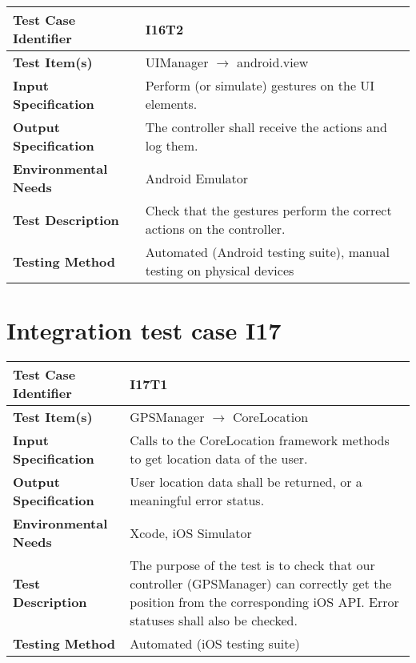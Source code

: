 \vspace{2em}

\noindent\begin{tabular}{l p{}}
    \hline
    \textbf{Test Case Identifier} & I16T2\\
    \hline
    \textbf{Test Item(s)} & UIManager $\rightarrow$ android.view \\
    \hline
    \textbf{Input Specification} & Perform (or simulate) gestures on the UI elements.\\
    \hline
    \textbf{Output Specification} & The controller shall receive the actions and log them. \\
    \hline
    \textbf{Environmental Needs} & Android Emulator \\
    \hline
    \textbf{Test Description} & Check that the gestures perform the correct actions on the controller.\\
    \hline
    \textbf{Testing Method} & Automated (Android testing suite), manual testing on physical devices \\
    \hline
\end{tabular}

\vspace{2em}

\section{Integration test case I17}

\begin{tabular}{l p{}}
    \hline
    \textbf{Test Case Identifier} & I17T1\\
    \hline
    \textbf{Test Item(s)} & GPSManager $\rightarrow$ CoreLocation \\
    \hline
    \textbf{Input Specification} & Calls to the CoreLocation framework methods to get location data of the user. \\
    \hline
    \textbf{Output Specification} & User location data shall be returned, or a meaningful error status. \\
    \hline
    \textbf{Environmental Needs} & Xcode, iOS Simulator \\
    \hline
    \textbf{Test Description} & The purpose of the test is to check that our controller (GPSManager) can correctly get the position from the corresponding iOS API. Error statuses shall also be checked. \\
    \hline
    \textbf{Testing Method} & Automated (iOS testing suite) \\
    \hline
\end{tabular}

